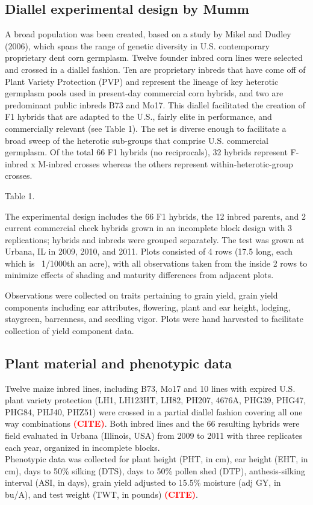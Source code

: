 \documentclass[10pt]{article}
\newcommand{\sme}[1]{\textcolor{red}{\bf #1}}
\begin{document}
\subsection*{Diallel experimental design by Mumm}
A broad population was been created, based on a study by Mikel and Dudley (2006), which spans the range of genetic diversity in U.S. contemporary proprietary dent corn germplasm.  Twelve founder inbred corn lines were selected and crossed in a diallel fashion.  Ten are proprietary inbreds that have come off of Plant Variety Protection (PVP) and represent the lineage of key heterotic germplasm pools used in present-day commercial corn hybrids, and two are predominant public inbreds B73 and Mo17.  This diallel facilitated the creation of F1 hybrids that are adapted to the U.S., fairly elite in performance, and commercially relevant (see Table 1).  The set is diverse enough to facilitate a broad sweep of the heterotic sub-groups that comprise U.S. commercial germplasm.  Of the total 66 F1 hybrids (no reciprocals), 32 hybrids represent F-inbred x M-inbred crosses whereas the others represent within-heterotic-group crosses.

Table 1.

The experimental design includes the 66 F1 hybrids, the 12 inbred parents, and 2 current commercial check hybrids grown in an incomplete block design with 3 replications; hybrids and inbreds were grouped separately.  The test was grown at Urbana, IL in 2009, 2010, and 2011.  Plots consisted of 4 rows (17.5 long, each which is ~1/1000th an acre), with all observations taken from the inside 2 rows to minimize effects of shading and maturity differences from adjacent plots.   

Observations were collected on traits pertaining to grain yield, grain yield components including ear attributes, flowering, plant and ear height, lodging, staygreen, barrenness, and seedling vigor.   Plots were hand harvested to facilitate collection of yield component data. 


\subsection*{Plant material and phenotypic data}
Twelve maize inbred lines, including B73, Mo17 and 10 lines with expired U.S. plant variety protection (LH1, LH123HT, LH82, PH207, 4676A, PHG39, PHG47, PHG84, PHJ40, PHZ51) were crossed in a partial diallel fashion covering all one way combinations \sme{(CITE)}. 
 Both inbred lines and the 66 resulting hybrids were field evaluated in Urbana (Illinois, USA) from 2009 to 2011 with three replicates each year, organized in incomplete blocks.\\
Phenotypic data was collected for plant height (PHT, in cm), ear height (EHT, in cm), days to 50\% silking (DTS), days to 50\% pollen shed (DTP), anthesis-silking interval (ASI, in days), grain yield adjusted to 15.5\% moisture (adj GY, in bu/A), and test weight (TWT, in pounds) \sme{(CITE)}.%
\end{document}
